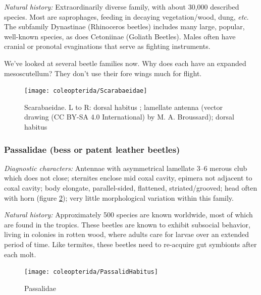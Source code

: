 \noindent{}\textit{Natural history:} Extraordinarily diverse family, with about 30,000 described species. Most are saprophages, feeding in decaying vegetation/wood, dung, \textit{etc}. The subfamily Dynastinae (Rhinoceros beetles) includes many large, popular, well-known species, as does Cetoniinae (Goliath Beetles). Males often have cranial or pronotal evaginations that serve as fighting instruments.

\begin{theo}
{}We've looked at several beetle families now. Why does each have an expanded mesoscutellum? They don't use their fore wings much for flight.
\end{theo}

\begin{figure}[ht!]
  \centering
    \texttt{[image: coleopterida/Scarabaeidae]}
  \caption{Scarabaeidae. L to R: dorsal habitus \citep[redrawn from][Plate V, Fig. 5]{bhlitem86018scarab}; lamellate antenna (vector drawing (CC BY-SA 4.0 International) by M. A. Broussard); dorsal habitus \citep[redrawn from plate in][]{bhlitem290909scarab}}
  \label{fig:scarabaeids}
\end{figure}

\subsubsection{Passalidae (bess or patent leather beetles)}
\noindent{}\textit{Diagnostic characters:} Antennae with asymmetrical lamellate 3--6 merous club which does not close; sternites enclose mid coxal cavity, epimera not adjacent to coxal cavity; body elongate, parallel-sided, flattened, striated/grooved; head often with horn (figure \ref{fig:passalid}); very little morphological variation within this family.\vspace{3mm}

\noindent{}\textit{Natural history:} Approximately 500 species are known worldwide, most of which are found in the tropics. These beetles are known to exhibit subsocial behavior, living in colonies in rotten wood, where adults care for larvae over an extended period of time. Like termites, these beetles need to re-acquire gut symbionts after each molt.

\begin{figure}[ht!]
  \centering
    \texttt{[image: coleopterida/PassalidHabitus]}
  \caption{Passalidae \citep[redrawn from][Fig. 1A]{bhlitem38036beetles}}
  \label{fig:passalid} 
\end{figure}

